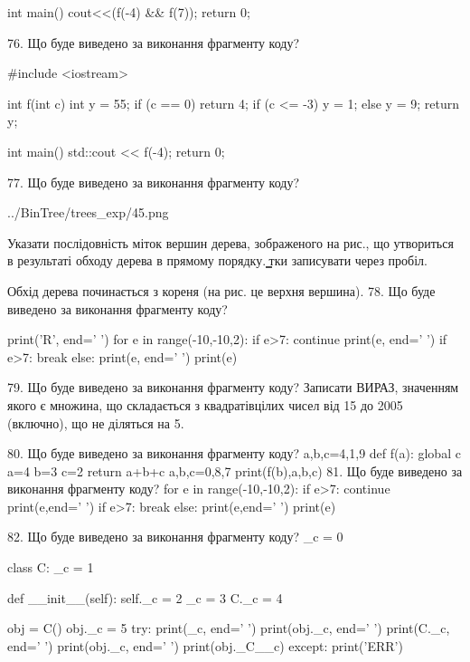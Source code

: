 \documentclass[11pt]{article}
\begin{document}
int main(){
    cout<<(f(-4) && f(7));
    return 0;
}

76. Що буде виведено за виконання фрагменту коду?

#include <iostream>

int f(int c){
    int y = 55;
    if (c == 0) 
        return 4;
    if (c <= -3)
         y = 1;
    else
         y = 9;
    return y;
}

int main(){
    std::cout << f(-4);
    return 0;
}


77. Що буде виведено за виконання фрагменту коду?

\begin{center}
	{../BinTree/trees_exp/45.png}
\end{center}
Указати послідовність міток вершин дерева, зображеного на рис., що утвориться в результаті обходу дерева в прямому порядку. ̳тки записувати через пробіл.\par Обхід дерева починається з кореня (на рис. це верхня вершина).
78. Що буде виведено за виконання фрагменту коду?

print('R', end=' ')
for e in range(-10,-10,2):
    if e>7:
        continue
        print(e, end=' ')
    if e>7:
        break
    else:
        print(e, end=' ')
    print(e)

79. Що буде виведено за виконання фрагменту коду?
Записати ВИРАЗ, значенням якого є множина, що складається з квадратівцілих чисел від 15 до 2005 (включно), що не діляться на 5.

80. Що буде виведено за виконання фрагменту коду?
a,b,c=4,1,9
   def f(a):
     global c     a=4
     b=3
     c=2
     return a+b+c
   a,b,c=0,8,7
   print(f(b),a,b,c)
81. Що буде виведено за виконання фрагменту коду?
for e in range(-10,-10,2):
    if e>7:
        continue
        print(e,end=' ')
    if e>7:
        break
    else:
        print(e,end=' ')
    print(e)

82. Що буде виведено за виконання фрагменту коду?
_c = 0

class C:
    _c = 1
    
    def __init__(self):
        self._c = 2
        _c = 3
        C._c = 4

obj = C()
obj._c = 5
try:
    print(_c, end=' ')
    print(obj._c, end=' ')
    print(C._c, end=' ')
    print(obj._c, end=' ')
    print(obj._C__c)
except:
    print('ERR')
\end{document}
